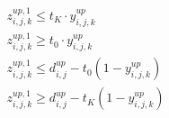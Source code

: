 \begin{align}
  & z_{i , j , k}^{up , 1} \leq t_{K} \cdot y_{i , j , k}^{up} \tag{eq\_0049\_a} \\
  & z_{i , j , k}^{up , 1} \geq t_{0} \cdot y_{i , j , k}^{up} \tag{eq\_0049\_b} \\
  & z_{i , j , k}^{up , 1} \leq d_{i , j}^{up} - t_{0} \left(1 - y_{i , j , k}^{up}\right) \tag{eq\_0049\_c} \\
  & z_{i , j , k}^{up , 1} \geq d_{i , j}^{up} - t_{K} \left(1 - y_{i , j , k}^{up}\right) \tag{eq\_0049\_d} \\
\end{align}
